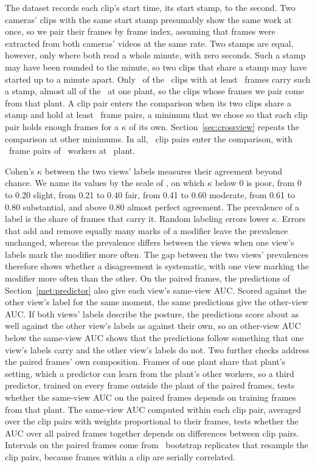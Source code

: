 \documentclass[review,3p,authoryear]{elsarticle}
\begin{document}
The dataset records each clip's start time, its start stamp, to the second. Two cameras' clips with the
same start stamp presumably show the same work at once, so we pair their frames by frame
index, assuming that frames were extracted from both cameras' videos at the same rate. Two stamps are equal, however, only where both read a whole minute, with zero seconds.
Such a stamp may have been rounded to the minute, so two clips that share a stamp may have
started up to a minute apart. Only \nTakesRoundedStamp\ of the \nTakes\ clips with at
least \xviewMinPairedFrames\ frames carry such a stamp, almost all of the
\nTakesRoundedStamp\ at one plant, so the clips whose frames we pair come from that plant. A clip pair
enters the comparison when its two clips share a stamp and hold at least
\xviewMinPairedFrames\ frame pairs, a minimum that we chose so that each clip pair holds
enough frames for a $\kappa$ of its own. Section~\ref{sec:crossview} repeats the
comparison at other minimums.
In all, \nXviewSessions\ clip pairs enter the comparison,
with \nXviewFrames\ frame pairs of \nXviewWorkers\ workers at \nXviewFactories\ plant.

Cohen's $\kappa$ between the two views' labels measures their agreement beyond chance. We
name its values by the scale of \citet{landis1977kappa}, on which $\kappa$ below 0 is poor,
from 0 to 0.20 slight, from 0.21 to 0.40 fair, from 0.41 to 0.60 moderate, from 0.61 to
0.80 substantial, and above 0.80 almost perfect agreement. The prevalence of a label is the
share of frames that carry it. Random labeling errors lower $\kappa$. Errors that add and
remove equally many marks of a modifier leave the prevalence unchanged, whereas the
prevalence differs between the views when one view's labels mark the modifier more often. The gap between the
two views' prevalences therefore shows whether a disagreement is systematic, with one view
marking the modifier more often than the other. On the paired frames, the predictions of Section~\ref{met:predictor} also give each view's
same-view AUC. Scored against the other view's label for the same moment, the same predictions give
the other-view AUC. If both views' labels describe the posture, the predictions score
about as well against the other view's labels as against their own, so an other-view AUC
below the same-view AUC shows that the predictions follow something that one view's labels
carry and the other view's labels do not. Two further checks address the paired frames' own composition. Frames of one plant share
that plant's setting, which a predictor can learn from the plant's other workers, so a third
predictor, trained on every frame outside the plant of the paired frames, tests whether
the same-view AUC on the paired frames depends on training frames from that plant. The same-view AUC
computed within each clip pair, averaged over the clip pairs with weights proportional to
their frames, tests whether the AUC over all paired frames together depends on differences between clip
pairs.
Intervals on the paired frames come from \nBoot\ bootstrap replicates that resample the
clip pairs, because frames within a clip are serially correlated.
\end{document}
